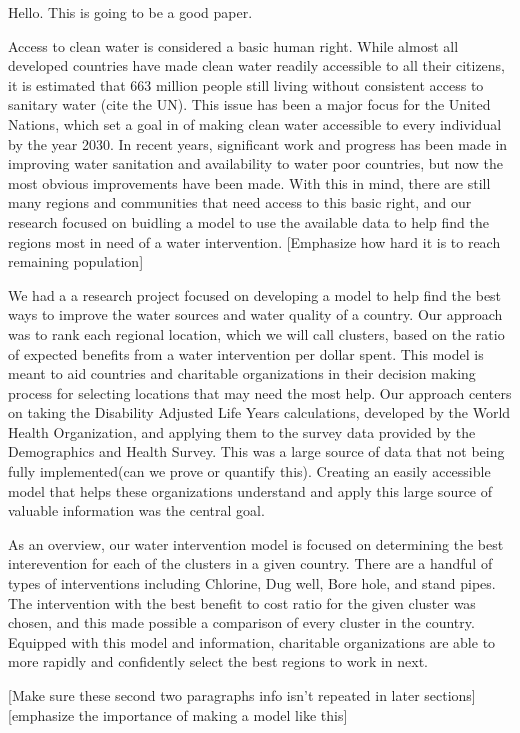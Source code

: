 Hello. This is going to be a good paper.

Access to clean water is considered a basic human right. While almost all developed countries have made clean water readily accessible to all their citizens, it is estimated that 663 million people still living without consistent access to sanitary water (cite the UN).
This issue has been a major focus for the United Nations, which set a goal in of making clean water accessible to every individual by the year 2030.
In recent years, significant work and progress has been made in improving water sanitation and availability to water poor countries, but now the most obvious improvements have been made.
With this in mind, there are still many regions and communities that need access to this basic right, and our research focused on buidling a model to use the available data to help find the regions most in need of a water intervention. 
[Emphasize how hard it is to reach remaining population] 

We had a a research project focused on developing a model to help find the best ways to improve the water sources and water quality of a country.
Our approach was to rank each regional location, which we will call clusters, based on the ratio of expected benefits from a water intervention per dollar spent.
This model is meant to aid countries and charitable organizations in their decision making process for selecting locations that may need the most help.
Our approach centers on taking the Disability Adjusted Life Years calculations, developed by the World Health Organization, and applying them to the survey data provided by the Demographics and Health Survey.
This was a large source of data that not being fully implemented(can we prove or quantify this).
Creating an easily accessible model that helps these organizations understand and apply this large source of valuable information was the central goal.  
	
As an overview, our water intervention model is focused on determining the best interevention for each of the clusters in a given country.
There are a handful of types of interventions including Chlorine, Dug well, Bore hole, and stand pipes.
The intervention with the best benefit to cost ratio for the given cluster was chosen, and this made possible a comparison of every cluster in the country.
Equipped with this model and information, charitable organizations are able to more rapidly and confidently select the best regions to work in next.

[Make sure these second two paragraphs info isn't repeated in later sections]
[emphasize the importance of making a model like this]
